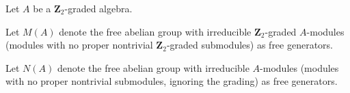 Let $A$ be a $\mathbf{Z}_2$-graded algebra.

Let $M(A)$ denote the free abelian group with irreducible $\mathbf{Z}_2$-graded $A$-modules (modules with no proper nontrivial $\mathbf{Z}_2$-graded submodules) as free generators.

Let $N(A)$ denote the free abelian group with irreducible $A$-modules (modules with no proper nontrivial submodules, ignoring the grading) as free generators.
